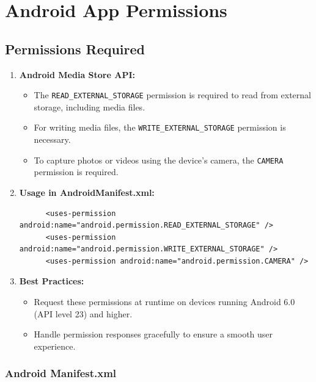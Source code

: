 \documentclass[11pt]{article}
\begin{document}
\section{Android App Permissions}

\subsection{Permissions Required}
\begin{enumerate}
    \item \textbf{Android Media Store API:}
          \begin{itemize}
              \item The \texttt{READ\_EXTERNAL\_STORAGE} permission is required to read from
                    external storage, including media files.
              \item For writing media files, the \texttt{WRITE\_EXTERNAL\_STORAGE} permission is
                    necessary.
              \item To capture photos or videos using the device's camera, the \texttt{CAMERA}
                    permission is required.
          \end{itemize}

    \item \textbf{Usage in AndroidManifest.xml:}
          \begin{verbatim}
      <uses-permission android:name="android.permission.READ_EXTERNAL_STORAGE" />
      <uses-permission android:name="android.permission.WRITE_EXTERNAL_STORAGE" />
      <uses-permission android:name="android.permission.CAMERA" />
    \end{verbatim}

    \item \textbf{Best Practices:}
          \begin{itemize}
              \item Request these permissions at runtime on devices running Android 6.0 (API level
                    23) and higher.
              \item Handle permission responses gracefully to ensure a smooth user experience.
          \end{itemize}
\end{enumerate}

\subsubsection{Android Manifest.xml}

\end{document}

